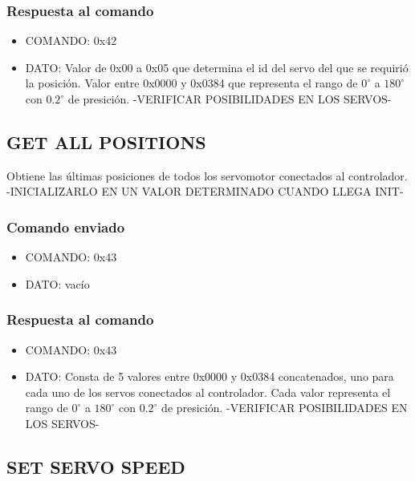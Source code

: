 \documentclass[a4paper,10pt]{article}
\begin{document}
\subsubsection*{Respuesta al comando}

\begin{itemize}
	\item{COMANDO:} 0x42
	\item{DATO:} Valor de 0x00 a 0x05 que determina el id del servo del que se requiri\'o la posici\'on.
	Valor entre 0x0000 y 0x0384 que representa el rango de $0^{\circ}$ a $180^{\circ}$ con $0.2^{\circ}$ de presici\'on. -VERIFICAR POSIBILIDADES EN LOS SERVOS-
\end{itemize}

\subsection{GET ALL POSITIONS}
\label{get_all_positions}

Obtiene las \'ultimas posiciones de todos los servomotor conectados al controlador. -INICIALIZARLO EN UN VALOR DETERMINADO CUANDO LLEGA INIT-

\subsubsection*{Comando enviado}

\begin{itemize}
	\item{COMANDO:} 0x43
	\item{DATO:} vac\'io
\end{itemize}

\subsubsection*{Respuesta al comando}

\begin{itemize}
	\item{COMANDO:} 0x43
	\item{DATO:} Consta de 5 valores entre 0x0000 y 0x0384 concatenados, uno para cada uno de los servos conectados al controlador.
	Cada valor representa el rango de $0^{\circ}$ a $180^{\circ}$ con $0.2^{\circ}$ de presici\'on. -VERIFICAR POSIBILIDADES EN LOS SERVOS-
\end{itemize}

\subsection{SET SERVO SPEED}
\label{set_servo_speed}
\end{document}
